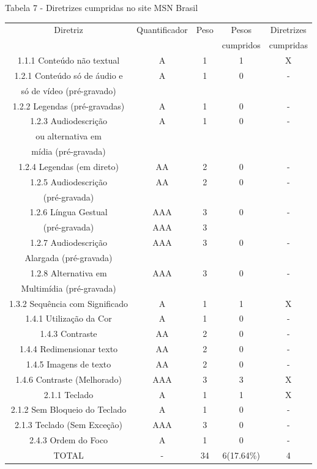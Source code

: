\documentclass[a4paper]{article}
\begin{document}
\begin{titlepage}
Tabela 7 - Diretrizes cumpridas no site MSN Brasil\\[-1cm]
\begin{center}
	\fontsize{8pt}{8pt}\selectfont	
	\begin{longtable}{|c|c|c|c|c|}
		\hline
		Diretriz & Quantificador & Peso & Pesos & Diretrizes\\
		& & & cumpridos & cumpridas\\
		\hline
		1.1.1 Conteúdo não textual & A & 1 & 1 & X \\
		\hline
		1.2.1 Conteúdo só de áudio e & A & 1 & 0 & - \\
		só de vídeo (pré-gravado) & & & & \\
		\hline
		1.2.2 Legendas (pré-gravadas) & A & 1 & 0 & - \\
		\hline
		1.2.3 Audiodescrição & A & 1 & 0 & - \\
		ou alternativa em & & & & \\
		mídia (pré-gravada) & & & & \\
		\hline
		1.2.4 Legendas (em direto) & AA & 2 & 0 & - \\
		\hline
		1.2.5 Audiodescrição & AA & 2 & 0 & - \\
		(pré-gravada) & & & & \\
		\hline
		1.2.6 Língua Gestual & AAA & 3 & 0 & - \\
		(pré-gravada) & AAA & 3 & & \\
		\hline
		1.2.7 Audiodescrição & AAA & 3 & 0 & - \\
		Alargada (pré-gravada) & & & & \\
		\hline
		1.2.8 Alternativa em & AAA & 3 & 0 & - \\
		Multimídia (pré-gravada) & & & & \\
		\hline
		1.3.2 Sequência com Significado & A & 1 & 1 & X \\
		\hline
		1.4.1 Utilização da Cor & A & 1 & 0 & - \\
		\hline
		1.4.3 Contraste & AA & 2 & 0 & - \\
		\hline
		1.4.4 Redimensionar texto & AA & 2 & 0 & - \\
		\hline
		1.4.5 Imagens de texto & AA & 2 & 0 & - \\
		\hline
		1.4.6 Contraste (Melhorado) & AAA & 3 & 3 & X \\
		\hline
		2.1.1 Teclado & A & 1 & 1 & X \\
		\hline
		2.1.2 Sem Bloqueio do Teclado & A & 1 & 0 & - \\
		\hline
		2.1.3 Teclado (Sem Exceção) & AAA & 3 & 0 & - \\
		\hline
		2.4.3 Ordem do Foco & A & 1 & 0 & - \\
		\hline
		TOTAL & - & 34 & 6(17.64\%) & 4 \\
		\hline
	\end{longtable}
\end{center}


\end{titlepage}
\end{document}
